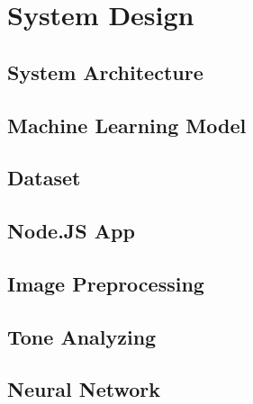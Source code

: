 \chapter{System Design}

\section{System Architecture}



\section{Machine Learning Model}

\section{Dataset}

\section{Node.JS App}

\section{Image Preprocessing}

\section{Tone Analyzing}

\section{Neural Network}